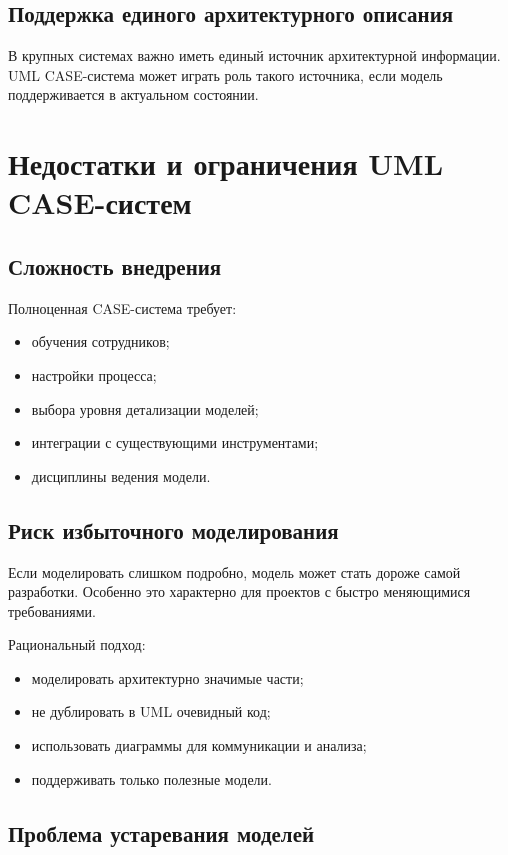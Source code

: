 \documentclass[12pt,a4paper]{article}
\begin{document}
\subsection{Поддержка единого архитектурного описания}

В крупных системах важно иметь единый источник архитектурной информации. UML CASE-система может играть роль такого источника, если модель поддерживается в актуальном состоянии.

\section{Недостатки и ограничения UML CASE-систем}

\subsection{Сложность внедрения}

Полноценная CASE-система требует:
\begin{itemize}
    \item обучения сотрудников;
    \item настройки процесса;
    \item выбора уровня детализации моделей;
    \item интеграции с существующими инструментами;
    \item дисциплины ведения модели.
\end{itemize}

\subsection{Риск избыточного моделирования}

Если моделировать слишком подробно, модель может стать дороже самой разработки. Особенно это характерно для проектов с быстро меняющимися требованиями.

Рациональный подход:
\begin{itemize}
    \item моделировать архитектурно значимые части;
    \item не дублировать в UML очевидный код;
    \item использовать диаграммы для коммуникации и анализа;
    \item поддерживать только полезные модели.
\end{itemize}

\subsection{Проблема устаревания моделей}
\end{document}
